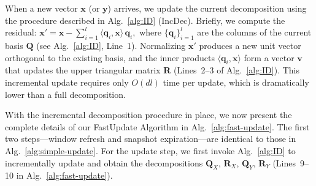   When a new vector \(\boldsymbol{x}\) (or \(\boldsymbol{y}\)) arrives, we update the current decomposition using the procedure described in Alg.\ \ref{alg:ID} (IncDec). Briefly, we compute the residual:
\(
\boldsymbol{x}' = \boldsymbol{x} - \sum_{i=1}^l \langle \boldsymbol{q}_i,\boldsymbol{x} \rangle\, \boldsymbol{q}_i,
\)
where \(\{\boldsymbol{q}_i\}_{i=1}^l\) are the columns of the current basis \(\boldsymbol{Q}\) (see Alg.\ \ref{alg:ID}, Line~1). Normalizing \(\boldsymbol{x}'\) produces a new unit vector orthogonal to the existing basis, and the inner products \(\langle \boldsymbol{q}_i,\boldsymbol{x} \rangle\) form a vector \(\boldsymbol{v}\) that updates the upper triangular matrix \(\boldsymbol{R}\) (Lines~2--3 of Alg.\ \ref{alg:ID}). This incremental update requires only \(O(dl)\) time per update, which is dramatically lower than a full decomposition.

 With the incremental decomposition procedure in place, we now present the complete details of our FastUpdate Algorithm in Alg.\ \ref{alg:fast-update}. The first two steps—window refresh and snapshot expiration—are identical to those in Alg.\ \ref{alg:simple-update}. For the update step, we first invoke Alg.\ \ref{alg:ID} to incrementally update and obtain the decompositions \(\boldsymbol{Q}_X\), \(\boldsymbol{R}_X\), \(\boldsymbol{Q}_Y\), \(\boldsymbol{R}_Y\) (Lines~9--10 in Alg.\ \ref{alg:fast-update}).







